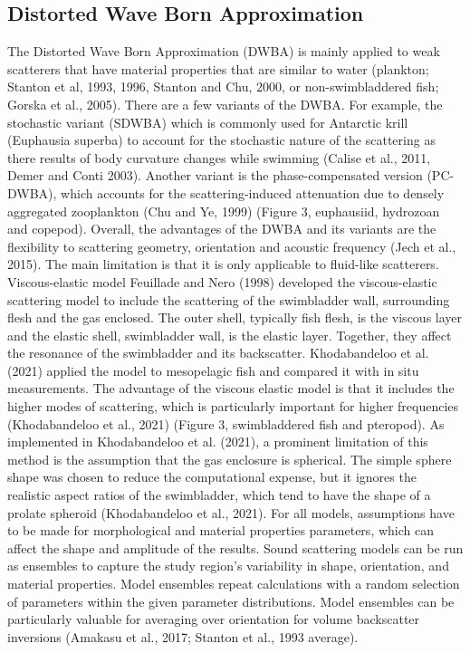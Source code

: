 \subsection{Distorted Wave Born Approximation}
The Distorted Wave Born Approximation (DWBA) is mainly applied to weak scatterers that have material properties that are similar to water (plankton; Stanton et al, 1993, 1996, Stanton and Chu, 2000, or non-swimbladdered fish; Gorska et al., 2005). There are a few variants of the DWBA. For example, the stochastic variant (SDWBA) which is commonly used for Antarctic krill (Euphausia superba) to account for the stochastic nature of the scattering as there results of body curvature changes while swimming (Calise et al., 2011, Demer and Conti 2003). Another variant is the phase-compensated version (PC-DWBA), which accounts for the scattering-induced attenuation due to densely aggregated zooplankton (Chu and Ye, 1999) (Figure 3, euphausiid, hydrozoan and copepod). Overall, the advantages of the DWBA and its variants are the flexibility to scattering geometry, orientation and acoustic frequency (Jech et al., 2015). The main limitation is that it is only applicable to fluid-like scatterers. 
Viscous-elastic model
Feuillade and Nero (1998) developed the viscous-elastic scattering model to include the scattering of the swimbladder wall, surrounding flesh and the gas enclosed. The outer shell, typically fish flesh, is the viscous layer and the elastic shell, swimbladder wall, is the elastic layer. Together, they affect the resonance of the swimbladder and its backscatter. Khodabandeloo et al. (2021) applied the model to mesopelagic fish and compared it with in situ measurements. The advantage of the viscous elastic model is that it includes the higher modes of scattering, which is particularly important for higher frequencies (Khodabandeloo et al., 2021) (Figure 3, swimbladdered fish and pteropod). As implemented in Khodabandeloo et al. (2021), a prominent limitation of this method is the assumption that the gas enclosure is spherical. The simple sphere shape was chosen to reduce the computational expense, but it ignores the realistic aspect ratios of the swimbladder, which tend to have the shape of a prolate spheroid (Khodabandeloo et al., 2021).
For all models, assumptions have to be made for morphological and material properties parameters, which can affect the shape and amplitude of the results. Sound scattering models can be run as ensembles to capture the study region's variability in shape, orientation, and material properties. Model ensembles repeat calculations with a random selection of parameters within the given parameter distributions. Model ensembles can be particularly valuable for averaging over orientation for volume backscatter inversions (Amakasu et al., 2017; Stanton et al., 1993 average). 
